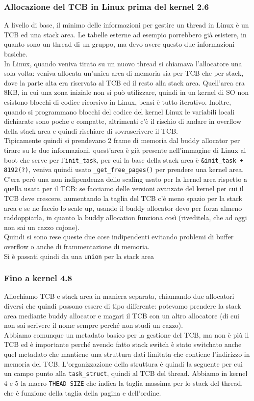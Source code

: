 \documentclass[12pt, oneside]{extbook}
\begin{document}
\subsubsection{Allocazione del TCB in Linux prima del kernel 2.6}
A livello di base, il minimo delle informazioni per gestire un thread in Linux è un TCB ed una stack area. Le tabelle esterne ad esempio porrebbero già esistere, in quanto sono un thread di un gruppo, ma devo avere questo due informazioni basiche.\\In Linux, quando veniva tirato su un nuovo thread si chiamava l'allocatore una sola volta: veniva allocata un'unica area di memoria sia per TCB che per stack, dove la parte alta era riservata al TCB ed il resto alla stack area. Quell'area era 8KB, in cui una zona iniziale non si può utilizzare, quindi in un kernel di SO non esistono blocchi di codice ricorsivo in Linux, bensì è tutto iterativo. Inoltre, quando si programmano blocchi del codice del kernel Linux le variabili locali dichiarate sono poche e compatte, altrimenti c'è il rischio di andare in overflow della stack area e quindi rischiare di sovrascrivere il TCB.\\Tipicamente quindi si prendevano 2 frame di memoria dal buddy allocator per tirare su le due informazioni, quest'area è già presente nell'immagine di Linux al boot che serve per l'\texttt{init\_task}, per cui la base della stack area è \texttt{\&init\_task + 8192(?)}, veniva quindi usato \texttt{\_get\_free\_pages()} per prendere una kernel area.\\ C'era però una non indipendenza dello scaling usato per la kernel area rispetto a quella usata per il TCB: se facciamo delle versioni avanzate del kernel per cui il TCB deve crescere, aumentando la taglia del TCB c'è meno spazio per la stack area e se ne faccio lo scale up, usando il buddy allocator devo per forza almeno raddoppiarla, in quanto la buddy allocation funziona così (riveditela, che ad oggi non sai un cazzo cojone).\\Quindi si sono rese queste due cose indipendenti evitando problemi di buffer overflow o anche di frammentazione di memoria.\\ Si è passati quindi da una \texttt{union} per la stack area
\subsubsection{Fino a kernel 4.8}
Allochiamo TCB e stack area in maniera separata, chiamando due allocatori diversi che quindi possono essere di tipo differente: potevamo prendere la stack area mediante buddy allocator e magari il TCB con un altro allocatore (di cui non sai scrivere il nome sempre perché non studi un cazzo).\\Abbiamo comunque un metadato basico per la gestione del TCB, ma non è più il TCB ed è importante perché avendo fatto stack switch è stato switchato anche quel metadato che mantiene una struttura dati limitata che contiene l'indirizzo in memoria del TCB. L'organizzazione della struttura è quindi la seguente
per cui un campo punto alla \texttt{task\_struct}, quindi al TCB del thread.
Abbiamo in kernel 4 e 5 la macro \texttt{THEAD\_SIZE} che indica la taglia massima per lo stack del thread, che è funzione della taglia della pagina e dell'ordine.
\end{document}
